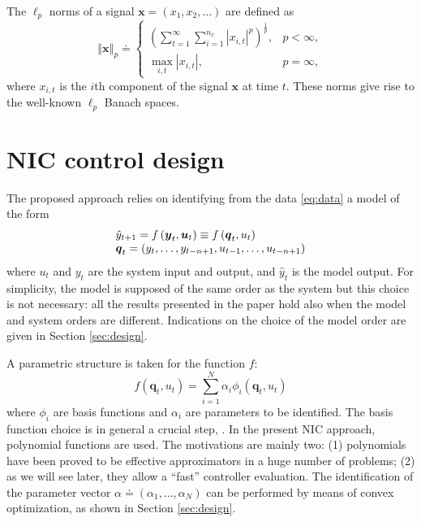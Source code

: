 \documentclass[twocolumn,english,journal]{IEEEtran}
\begin{document}
The $\ell_{p}$ norms of a signal $\boldsymbol{x}=(x_{1},x_{2},\ldots)$
are defined as
\[
\left\Vert \boldsymbol{x}\right\Vert _{p}\doteq\begin{cases}
\left(\sum_{t=1}^{\infty}\sum_{i=1}^{n_{x}}\left|x_{i,t}\right|^{p}\right)^{\frac{1}{p}}, & p<\infty,\\
\max_{i,t}\left|x_{i,t}\right|, & p=\infty,
\end{cases}
\]
where $x_{i,t}$ is the $i$th component of the signal $\boldsymbol{x}$
at time $t$. These norms give rise to the well-known $\ell_{p}$
Banach spaces.


\section{NIC control design}

\label{sub:nl_des}

The proposed approach relies on identifying from the data \eqref{eq:data}
a model of the form
\begin{equation}
\begin{array}[t]{l}
\hat{y}_{t+1}=f\left(\boldsymbol{y}_{t},\boldsymbol{u}_{t}\right)\equiv f\left(\boldsymbol{q}_{t},u_{t}\right)\\
\boldsymbol{q}_{t}=\left(y_{t},\ldots,y_{t-n+1},u_{t-1},\ldots,u_{t-n+1}\right)
\end{array}\label{eq:model}
\end{equation}
where $u_{t}$ and $y_{t}$ are the system input and output, and $\hat{y}_{t}$
is the model output. For simplicity, the model is supposed of the
same order as the system but this choice is not necessary: all the
results presented in the paper hold also when the model and system
orders are different. Indications on the choice of the model order
are given in Section \ref{sec:design}.

A parametric structure is taken for the function $f$:
\begin{equation}
f\left(\boldsymbol{q}_{t},u_{t}\right)=\sum_{i=1}^{N}\alpha_{i}\phi_{i}\left(\boldsymbol{q}_{t},u_{t}\right)\label{eq:bfe}
\end{equation}
where $\phi_{i}$ are basis functions and $\alpha_{i}$ are parameters
to be identified. The basis function choice is in general a crucial
step, \cite{LLju1,HsNoAUT06,Novara2011711}. In the present NIC approach,
polynomial functions are used. The motivations are mainly two: (1)
polynomials have been proved to be effective approximators in a huge
number of problems; (2) as we will see later, they allow a ``fast''
controller evaluation. The identification of the parameter vector
$\alpha\doteq(\alpha_{1},\ldots,\alpha_{N})$ can be performed by
means of convex optimization, as shown in Section \ref{sec:design}.
\end{document}
